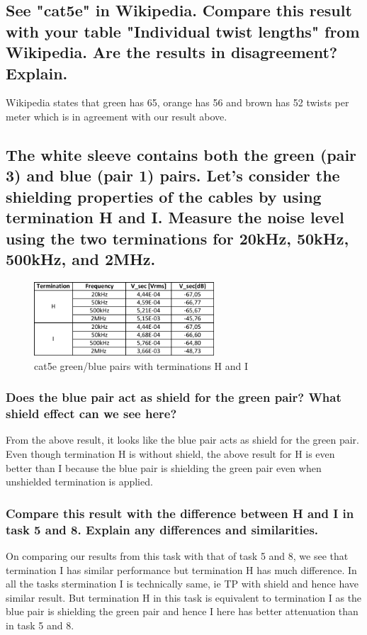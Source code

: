 \documentclass[12pt,a4paper,UKenglish]{article}
\begin{document}
\subsection{See "cat5e" in Wikipedia. Compare this result with your table "Individual twist lengths" from Wikipedia. Are the results in disagreement? Explain.}
Wikipedia states that green has 65, orange has 56 and brown has 52 twists per meter which is in agreement with our result above.
\subsection{The white sleeve contains both the green (pair 3) and blue (pair 1) pairs. Let's consider the shielding properties of the cables by using termination H and I. Measure the noise level using the two terminations for 20kHz, 50kHz, 500kHz, and 2MHz.}
\begin{figure} [H] %
  \centering 
  \includegraphics[width=0.6\textwidth]{img/task11c_data.pdf} 
  \caption{cat5e green/blue pairs with terminations H and I}
  \label{fig:task11c} 
\end{figure}
\subsubsection{Does the blue pair act as shield for the green pair? What shield effect can we see here?}
From the above result, it looks like the blue pair acts as shield for the green pair. Even though termination H is without shield, the above result for H is even better than I because the blue pair is shielding the green pair even when unshielded termination is applied.
\subsubsection{Compare this result with the difference between H and I in task 5 and 8. Explain any differences and similarities.}
On comparing our results from this task with that of task 5 and 8, we see that termination I has similar performance but termination H has much difference. In all the tasks stermination I is technically same, ie TP with shield and hence have similar result. But termination H in this task is equivalent to termination I as the blue pair is shielding the green pair and hence I here has better attenuation than in task 5 and 8.
\end{document}

